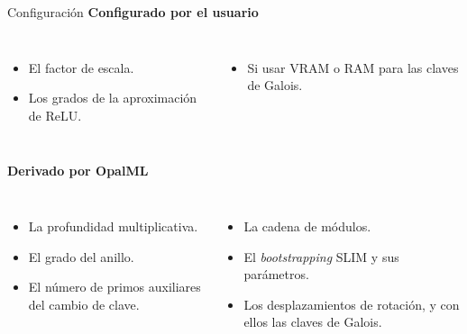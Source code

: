 \begin{frame}{Configuración}
    \textbf{Configurado por el usuario}
    \vspace{-0.25cm}
    \begin{columns}[t]
        \begin{itemize}
            \setlength{\itemsep}{6pt}
            \item El factor de escala.
            \item Los grados de la aproximación de ReLU.
        \end{itemize}

        \begin{itemize}
            \setlength{\itemsep}{6pt}
            \item Si usar VRAM o RAM para las claves de Galois.
        \end{itemize}
    \end{columns}

    \vspace{0.55cm}
    \textbf{Derivado por OpalML}
    \vspace{-0.25cm}
    \begin{columns}[t]
        \begin{itemize}
            \setlength{\itemsep}{6pt}
            \item La profundidad multiplicativa.
            \item El grado del anillo.
            \item El número de primos auxiliares del cambio de clave.
        \end{itemize}

        \begin{itemize}
            \setlength{\itemsep}{6pt}
            \item La cadena de módulos.
            \item El \textit{bootstrapping} SLIM y sus parámetros.
            \item Los desplazamientos de rotación, y con ellos las claves de Galois.
        \end{itemize}
    \end{columns}
\end{frame}

